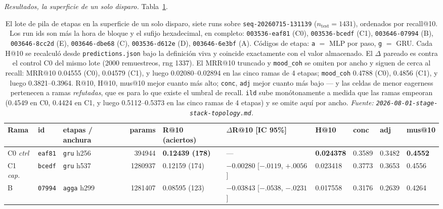 \documentclass[11pt]{article}
\newcommand{\runid}[1]{\texttt{\small\seqsplit{#1}}}
\newcommand{\dsid}[1]{\texttt{\small #1}}
\newcommand{\best}[1]{\textbf{#1}}
\begin{document}
\emph{Resultados, la superficie de un solo disparo.} Tabla~\ref{tab:nexttrack-stagestack-s1}.

\begin{table}[ht]
  \centering
  \caption{El lote de pila de etapas en la superficie de un solo disparo, siete
  runs sobre \dsid{seq-20260715-131139}
  ($n_{\mathrm{test}}=\num{1431}$), ordenados por recall@10. Los run ids son
  \protect\runid{run-20260801-} más la hora de bloque y el sufijo hexadecimal, en
  completo: \texttt{003536-eaf81} (C0), \texttt{003536-bcedf} (C1),
  \texttt{003646-07994} (B), \texttt{003646-8cc2d} (E), \texttt{003646-dbe68} (C),
  \texttt{003536-d612e} (D), \texttt{003646-6e3bf} (A). Códigos de etapa:
  \texttt{a} $=$ MLP por paso, \texttt{g} $=$ GRU. Cada H@10 se recalculó desde
  \texttt{predictions.json} bajo la definición viva y coincide exactamente con el
  valor almacenado. El $\Delta$ pareado es contra el control C0 del mismo lote
  (\num{2000} remuestreos, rng \num{1337}). El MRR@10 truncado y
  \texttt{mood\_coh} se omiten por ancho y siguen de cerca al recall: MRR@10
  \num{0.04555} (C0), \num{0.04579} (C1), y luego
  \numrange{0.02080}{0.02894} en las cinco ramas de 4 etapas;
  \texttt{mood\_coh} \num{0.4788} (C0), \num{0.4856} (C1), y luego
  \numrange{0.3821}{0.3964}. R@10, H@10, mus@10 mejor cuanto más alto;
  \texttt{conc}, \texttt{adj} mejor cuanto más bajo --- y las celdas de menor
  eagerness pertenecen a ramas \emph{refutadas}, que es para lo que existe el
  umbral de recall. \texttt{ild} sube monótonamente a medida que las ramas empeoran
  (\num{0.4549} en C0, \num{0.4424} en C1, y luego
  \numrange{0.5112}{0.5373} en las cinco ramas de 4 etapas) y se omite aquí por
  ancho.
  \emph{Fuente: \texttt{2026-08-01-stage-stack-topology.md}.}}
  \label{tab:nexttrack-stagestack-s1}
  {\scriptsize\setlength{\tabcolsep}{2.0pt}\begin{tabular}{lllrllllll}
    \toprule
    Rama & id & etapas / anchura & params & R@10 (aciertos) & $\Delta$R@10 [IC 95\%] & H@10 & conc & adj & mus@10 \\
    \midrule
    C0 \emph{ctrl} & \texttt{eaf81} & \texttt{gru} h256 & \num{394944} & \best{0.12439 (178)} & --- & \best{0.024378} & 0.3589 & 0.3482 & \best{0.4552} \\
    C1 \emph{cap.} & \texttt{bcedf} & \texttt{gru} h537 & \num{1280937} & 0.12159 (174) & $-0.00280$ [$-.0119$, $+.0056$] & 0.023418 & 0.3773 & 0.3653 & 0.4556 \\
    B & \texttt{07994} & \texttt{agga} h299 & \num{1281407} & 0.08595 (123) & $-0.03843$ [$-.0538$, $-.0231$] & 0.017558 & 0.3176 & 0.2639 & 0.4264 \\

\end{tabular}}
\end{table}
\end{document}
